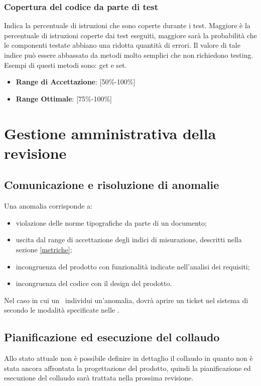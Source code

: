 \documentclass[12pt,a4paper]{article}
\begin{document}
\subsubsection{Copertura del codice da parte di test}
Indica la percentuale di istruzioni che sono coperte durante i test. Maggiore è la percentuale di istruzioni coperte dai test eseguiti, maggiore sarà la probabilità che le componenti testate abbiano una ridotta quantità di errori. Il valore di tale indice può essere abbassato da metodi molto semplici che non richiedono testing. Esempi di questi metodi sono: get e set.
\begin{itemize}
\item \textbf{Range di Accettazione}: [50\%-100\%]
\item \textbf{Range Ottimale}: [75\%-100\%]
\end{itemize}

\newpage
\section{Gestione amministrativa della revisione}
\subsection{Comunicazione e risoluzione di anomalie}
Una anomalia corrisponde a:
\begin{itemize}
\item violazione delle norme tipografiche da parte di un documento;
\item uscita dal range di accettazione degli indici di misurazione, descritti nella sezione \ref{metriche};
\item incongruenza del prodotto con funzionalità indicate nell’analisi dei requisiti;
\item incongruenza del codice con il design del prodotto.
\end{itemize}
Nel caso in cui un \VR\ individui un’anomalia, dovrà aprire un ticket nel sistema di  secondo le modalità specificate nelle \NdP.
\subsection{Pianificazione ed esecuzione del collaudo}
Allo stato attuale non è possibile definire in dettaglio il collaudo in quanto non è stata ancora affrontata la progettazione del prodotto, quindi la pianificazione ed esecuzione del collaudo sarà trattata nella prossima revisione.

\newpage
\appendix
\end{document}
